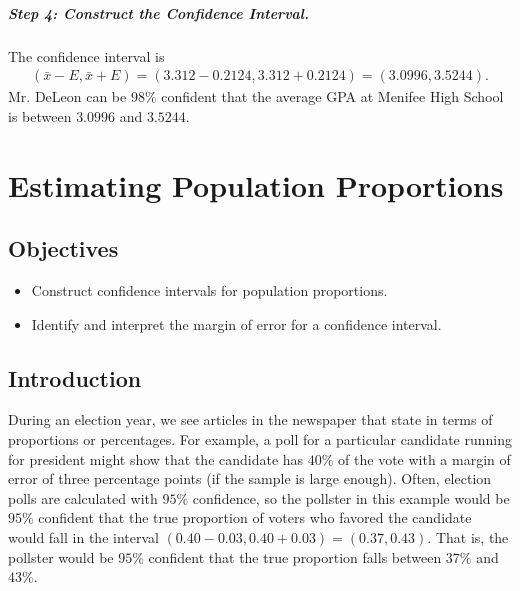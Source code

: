 \documentclass[letterpaper,10pt,english]{jupyterBook}
\begin{document}
\subparagraph{Step 4: Construct the Confidence Interval.}
\label{\detokenize{Ch5 Confidence Intervals/5.1 Estimating Population Means (Sigma Known):id6}}
\sphinxAtStartPar
The confidence interval is
\begin{equation*}
\begin{split}(\bar{x} - E, \bar{x} + E) = (3.312 - 0.2124, 3.312 + 0.2124) = (3.0996, 3.5244).\end{split}
\end{equation*}
\sphinxAtStartPar
Mr. DeLeon can be \(98\%\) confident that the average GPA at Menifee High School is between \(3.0996\) and \(3.5244\).

\sphinxstepscope


\section{Estimating Population Proportions}
\label{\detokenize{Ch5 Confidence Intervals/5.2 Estimating Population Proportions:estimating-population-proportions}}\label{\detokenize{Ch5 Confidence Intervals/5.2 Estimating Population Proportions::doc}}

\subsection{Objectives}
\label{\detokenize{Ch5 Confidence Intervals/5.2 Estimating Population Proportions:objectives}}\begin{itemize}
\item {} 
\sphinxAtStartPar
Construct confidence intervals for population proportions.

\item {} 
\sphinxAtStartPar
Identify and interpret the margin of error for a confidence interval.

\end{itemize}


\subsection{Introduction}
\label{\detokenize{Ch5 Confidence Intervals/5.2 Estimating Population Proportions:introduction}}
\sphinxAtStartPar
During an election year, we see articles in the newspaper that state  in terms of proportions or percentages. For example, a poll for a particular candidate running for president might show that the candidate has \(40\%\) of the vote with a margin of error of three percentage points (if the sample is large enough). Often, election polls are calculated with \(95\%\) confidence, so the pollster in this example would be \(95\%\) confident that the true proportion of voters who favored the candidate would fall in the interval \((0.40 - 0.03, 0.40 + 0.03) = (0.37, 0.43)\). That is, the pollster would be \(95\%\) confident that the true proportion falls between \(37\%\) and \(43\%\).
\end{document}
